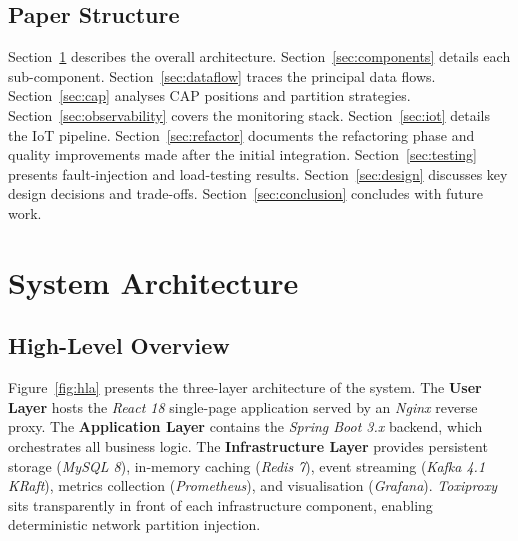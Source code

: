 \documentclass[12pt,a4paper,twoside]{article}
\newcommand{\tech}[1]{\textit{#1}}
\begin{document}
\subsection{Paper Structure}

Section~\ref{sec:arch} describes the overall architecture.
Section~\ref{sec:components} details each sub-component.
Section~\ref{sec:dataflow} traces the principal data flows.
Section~\ref{sec:cap} analyses CAP positions and partition strategies.
Section~\ref{sec:observability} covers the monitoring stack.
Section~\ref{sec:iot} details the IoT pipeline.
Section~\ref{sec:refactor} documents the refactoring phase and quality
improvements made after the initial integration.
Section~\ref{sec:testing} presents fault-injection and load-testing results.
Section~\ref{sec:design} discusses key design decisions and trade-offs.
Section~\ref{sec:conclusion} concludes with future work.

\section{System Architecture}
\label{sec:arch}

\subsection{High-Level Overview}

Figure~\ref{fig:hla} presents the three-layer architecture of the system.
The \textbf{User Layer} hosts the \tech{React 18} single-page application
served by an \tech{Nginx} reverse proxy.
The \textbf{Application Layer} contains the \tech{Spring Boot 3.x} backend,
which orchestrates all business logic.
The \textbf{Infrastructure Layer} provides persistent storage (\tech{MySQL 8}),
in-memory caching (\tech{Redis 7}), event streaming (\tech{Kafka 4.1 KRaft}),
metrics collection (\tech{Prometheus}), and visualisation (\tech{Grafana}).
\tech{Toxiproxy} sits transparently in front of each infrastructure
component, enabling deterministic network partition injection.
\end{document}
